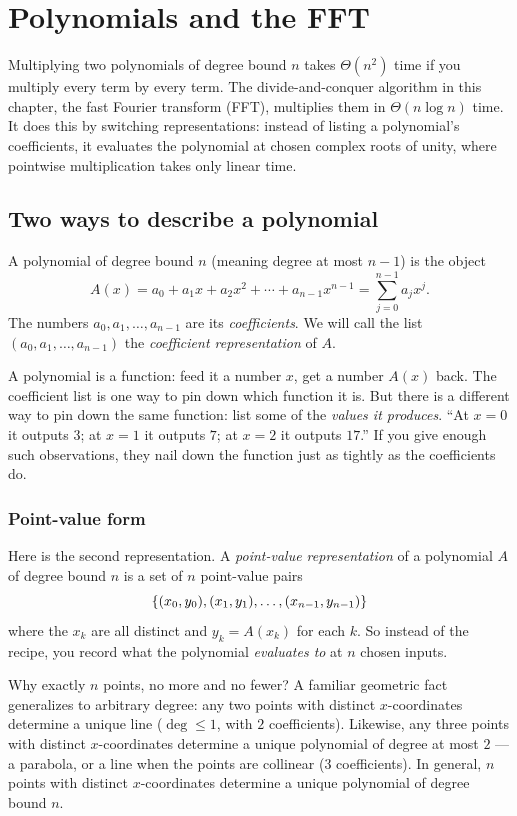 \chapter{Polynomials and the FFT}

Multiplying two polynomials of degree bound $n$ takes $\Theta(n^2)$ time if you multiply every term by every term. The divide-and-conquer algorithm in this chapter, the fast Fourier transform (FFT), multiplies them in $\Theta(n\log n)$ time. It does this by switching representations: instead of listing a polynomial's coefficients, it evaluates the polynomial at chosen complex roots of unity, where pointwise multiplication takes only linear time.

\section{Two ways to describe a polynomial}

A polynomial of degree bound $n$ (meaning degree at most $n-1$) is the object
\[
A(x) = a_0 + a_1 x + a_2 x^2 + \cdots + a_{n-1}x^{n-1} = \sum_{j=0}^{n-1} a_j x^j.
\]
The numbers $a_0, a_1, \dots, a_{n-1}$ are its \emph{coefficients}. We will call the list
$(a_0, a_1, \dots, a_{n-1})$ the \emph{coefficient representation} of $A$.

\begin{intuitionbox}
A polynomial is a function: feed it a number $x$, get a number $A(x)$ back. The
coefficient list is one way to pin down which function it is. But there is a
different way to pin down the same function: list some of the
\emph{values it produces}. ``At $x=0$ it outputs $3$; at $x=1$ it outputs $7$;
at $x=2$ it outputs $17$.'' If you give enough such observations, they nail down the
function just as tightly as the coefficients do.
\end{intuitionbox}

\subsection{Point-value form}

Here is the second representation. A \emph{point-value representation} of a
polynomial $A$ of degree bound $n$ is a set of $n$ point-value pairs
\[
\{(x_0, y_0), (x_1, y_1), \dots, (x_{n-1}, y_{n-1})\}
\]
where the $x_k$ are all distinct and $y_k = A(x_k)$ for each $k$. So instead of the
recipe, you record what the polynomial \emph{evaluates to} at $n$ chosen inputs.

Why exactly $n$ points, no more and no fewer? A familiar geometric fact
generalizes to arbitrary degree: any two points with distinct $x$-coordinates
determine a unique line ($\deg \le 1$, with $2$ coefficients). Likewise, any
three points with distinct $x$-coordinates determine a unique polynomial of
degree at most $2$ --- a parabola, or a line when the points are collinear ($3$
coefficients). In general, $n$ points with distinct $x$-coordinates determine a
unique polynomial of degree bound $n$.


